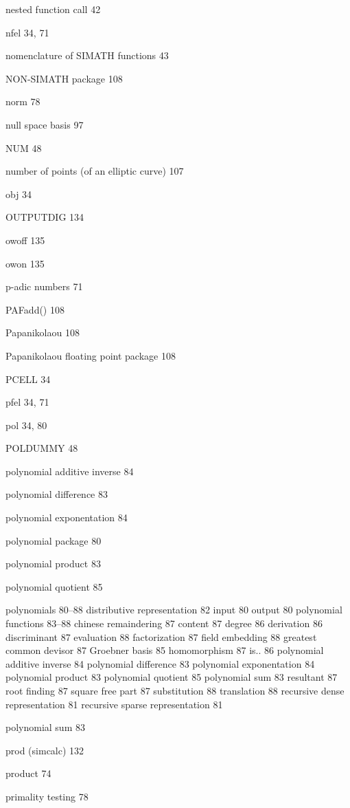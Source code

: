 \begin{theindex}
\indexspace

\item nested function call 42
\item nfel 34, 71
\item nomenclature of SIMATH functions 43 
\item NON-SIMATH package 108
\item norm 78
\item null space basis 97
\item NUM 48
\item number of points (of an elliptic curve) 107

\indexspace

\item obj 34
\item OUTPUTDIG 134
\item owoff 135
\item owon 135
\indexspace

\item p-adic numbers 71
\item PAFadd() 108
\item Papanikolaou 108
\item Papanikolaou floating point package 108  
\item PCELL 34
\item pfel 34, 71
\item pol 34, 80
\item POLDUMMY 48
\item polynomial additive inverse 84
\item polynomial difference 83
\item polynomial exponentation 84
\item polynomial package 80
\item polynomial product 83
\item polynomial quotient 85
\item polynomials 80--88
  \subitem distributive representation 82
  \subitem input 80
  \subitem output 80
  \subitem polynomial functions 83--88
    \subsubitem chinese remaindering 87
    \subsubitem content 87
    \subsubitem degree 86
    \subsubitem derivation 86
    \subsubitem discriminant 87
    \subsubitem evaluation 88
    \subsubitem factorization 87
    \subsubitem field embedding 88
    \subsubitem greatest common devisor 87    
    \subsubitem Groebner basis 85
    \subsubitem homomorphism 87
    \subsubitem is.. 86
    \subsubitem polynomial additive inverse 84
    \subsubitem polynomial difference 83
    \subsubitem polynomial exponentation 84
    \subsubitem polynomial product 83
    \subsubitem polynomial quotient 85
    \subsubitem polynomial sum 83
    \subsubitem resultant 87    
    \subsubitem root finding 87
    \subsubitem square free part 87
    \subsubitem substitution 88 
    \subsubitem translation 88
  \subitem recursive dense representation 81
  \subitem recursive sparse representation 81
\item polynomial sum 83
\item prod (simcalc) 132
\item product 74
\item primality testing 78


\end{theindex}
